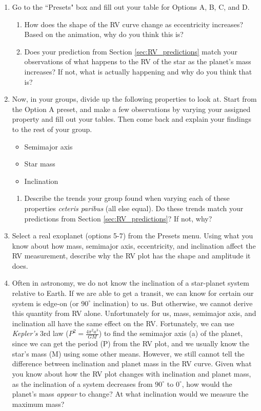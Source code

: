 \documentclass[11pt]{article}
\begin{document}
\begin{enumerate}
    \item Go to the ``Presets" box and fill out your table for Options A, B, C, and D.
    \begin{enumerate}
        \item How does the shape of the RV curve change as eccentricity increases? Based on the animation, why do you think this is?
        \item Does your prediction from Section \ref{sec:RV_predictions} match your observations of what happens to the RV of the star as the planet's mass increases?  If not, what is actually happening and why do you think that is?
    \end{enumerate}
    
    \item Now, in your groups, divide up the following properties to look at.  Start from the Option A preset, and make a few observations by varying your assigned property and fill out your tables.  Then come back and explain your findings to the rest of your group.
    \begin{itemize}
        \item Semimajor axis
        \item Star mass
        \item Inclination
    \end{itemize}
    \begin{enumerate}
        \item Describe the trends your group found when varying each of these properties \textit{ceteris paribus} (all else equal).  Do these trends match your predictions from Section \ref{sec:RV_predictions}?  If not, why?
    \end{enumerate}
    
    \item Select a real exoplanet (options 5-7) from the Presets menu.  Using what you know about how mass, semimajor axis, eccentricity, and inclination affect the RV measurement, describe why the RV plot has the shape and amplitude it does.
    
    \item Often in astronomy, we do not know the inclination of a star-planet system relative to Earth.  If we are able to get a transit, we can know for certain our system is edge-on (or $90^\circ$ inclination) to us. But otherwise, we cannot derive this quantity from RV alone. Unfortunately for us, mass, semimajor axis, and inclination all have the same effect on the RV. Fortunately, we can use \textit{Kepler's} 3rd law ($P^2 =\frac{ 4\pi^2a^3}{GM}$) to find the semimajor axis (a) of the planet, since we can get the period (P) from the RV plot, and we usually know the star's mass (M) using some other means.  However, we still cannot tell the difference between inclination and planet mass in the RV curve. Given what you know about how the RV plot changes with inclination and planet mass, as the inclination of a system decreases from $90^\circ$ to $0^\circ$, how would the planet's mass \textit{appear} to change? At what inclination would we measure the maximum mass?
\end{enumerate}
\end{document}
